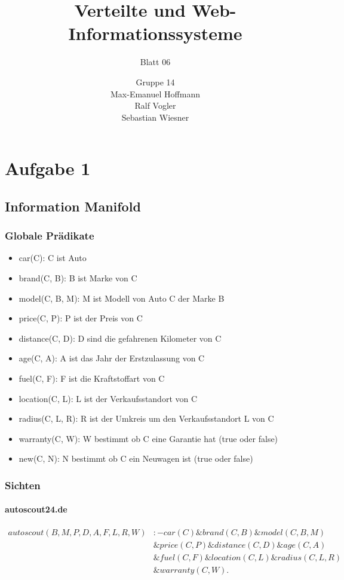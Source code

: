 \documentclass[11pt,a4paper]{scrartcl}
\begin{document}
\author{Gruppe 14\\Max-Emanuel Hoffmann\\Ralf Vogler\\Sebastian Wiesner}
\title{Verteilte und Web-Informationssysteme}
\subtitle{Blatt 06}

\maketitle

\section{Aufgabe 1}
\subsection{Information Manifold}
\subsubsection{Globale Prädikate}
\begin{itemize}
\item car(C): C ist Auto
\item brand(C, B): B ist Marke von C
\item model(C, B, M): M ist Modell von Auto C der Marke B
\item price(C, P): P ist der Preis von C
\item distance(C, D): D sind die gefahrenen Kilometer von C
\item age(C, A): A ist das Jahr der Erstzulassung von C
\item fuel(C, F): F ist die Kraftstoffart von C
\item location(C, L): L ist der Verkaufsstandort von C
\item radius(C, L, R): R ist der Umkreis um den Verkaufsstandort L von C
\item warranty(C, W): W bestimmt ob C eine Garantie hat (true oder false)
\item new(C, N): N bestimmt ob C ein Neuwagen ist (true oder false)
\end{itemize}

\subsubsection{Sichten}
\paragraph*{autoscout24.de}
\begin{align*}
autoscout(B,M,P,D,A,F,L,R,W) &:- car(C) \& brand(C,B) \& model(C,B,M)\\
&\& price(C,P) \& distance(C,D) \& age(C,A)\\
&\& fuel(C,F) \& location(C,L) \& radius(C,L,R)\\
&\& warranty(C,W).
\end{align*}
\end{document}
